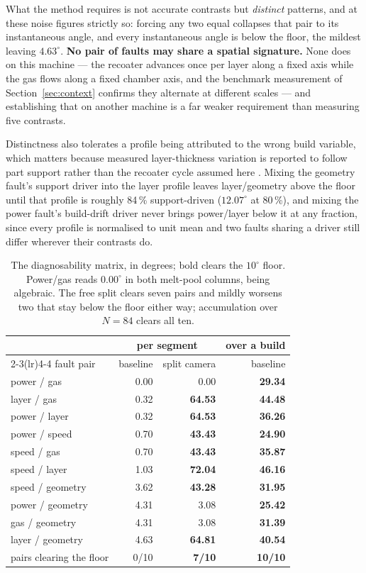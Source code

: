\documentclass[preprint,times]{elsarticle}
\begin{document}
What the method requires is not accurate contrasts but \emph{distinct} patterns,
and at these noise figures strictly so: forcing any two equal collapses that pair
to its instantaneous angle, and every instantaneous angle is below the floor, the
mildest leaving $4.63^\circ$. \textbf{No pair of faults may share a spatial
signature.} None does on this machine --- the recoater advances once per layer
along a fixed axis while the gas flows along a fixed chamber axis, and the
benchmark measurement of Section~\ref{sec:context} confirms they alternate at
different scales --- and establishing that on another machine is a far weaker
requirement than measuring five contrasts.

Distinctness also tolerates a profile being attributed to the wrong build
variable, which matters because measured layer-thickness variation is reported
to follow part support rather than the recoater cycle assumed here
\cite{Liu2022}. Mixing the geometry fault's support driver into the layer
profile leaves layer/geometry above the floor until that profile is roughly
84\,\% support-driven ($12.07^\circ$ at 80\,\%), and mixing the power fault's
build-drift driver never brings power/layer below it at any fraction, since
every profile is normalised to unit mean and two faults sharing a driver still
differ wherever their contrasts do.

\begin{table}[htbp]
\centering
\caption{The diagnosability matrix, in degrees; bold clears the $10^\circ$ floor.
Power/gas reads $0.00^\circ$ in both melt-pool columns, being algebraic. The free
split clears seven pairs and mildly worsens two that stay below the floor either
way; accumulation over $N=84$ clears all ten.}
\label{tab:matrix}
\scriptsize
\begin{tabular}{@{}lrrr@{}}
\toprule
 & \multicolumn{2}{c}{per segment} & over a build \\
\cmidrule(lr){2-3}\cmidrule(lr){4-4}
fault pair & baseline & split camera & baseline \\
\midrule
power / gas      & 0.00 & 0.00 & \textbf{29.34} \\
layer / gas      & 0.32 & \textbf{64.53} & \textbf{44.48} \\
power / layer    & 0.32 & \textbf{64.53} & \textbf{36.26} \\
power / speed    & 0.70 & \textbf{43.43} & \textbf{24.90} \\
speed / gas      & 0.70 & \textbf{43.43} & \textbf{35.87} \\
speed / layer    & 1.03 & \textbf{72.04} & \textbf{46.16} \\
speed / geometry & 3.62 & \textbf{43.28} & \textbf{31.95} \\
power / geometry & 4.31 & 3.08 & \textbf{25.42} \\
gas / geometry   & 4.31 & 3.08 & \textbf{31.39} \\
layer / geometry & 4.63 & \textbf{64.81} & \textbf{40.54} \\
\midrule
pairs clearing the floor & 0/10 & \textbf{7/10} & \textbf{10/10} \\
\bottomrule
\end{tabular}
\end{table}
\end{document}
